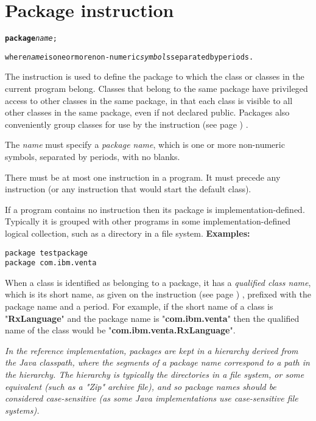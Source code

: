 \chapter{Package instruction}\label{refpackage}
\begin{shaded}
\begin{alltt}
\textbf{package} \emph{name};

where \emph{name} is one or more non-numeric \emph{symbol}s separated by periods.
\end{alltt}
\end{shaded}
 
The  instruction is used to define the package to which
the class or classes in the current program belong.
 Classes that belong to the same package have privileged access to
other classes in the same package, in that each class is visible to all
other classes in the same package, even if not declared public.
Packages also conveniently group classes for use by the
  instruction (see page \pageref{refimport}) .
 
The \emph{name} must specify a \emph{package name}, which is one
or more non-numeric symbols, separated by periods, with no
blanks.
 
There must be at most one  instruction in a program.
It must precede any  instruction (or any instruction that
would start the default class).
 
If a program contains no  instruction then its package
is implementation-defined.  Typically it is grouped with other programs
in some implementation-defined logical collection, such as a directory
in a file system.
 \textbf{Examples:}
\begin{lstlisting}
package testpackage
package com.ibm.venta
\end{lstlisting}
 
When a class is identified as belonging to a package, it has a
\emph{qualified class name}, which is its short name, as given on the
  instruction (see page \pageref{refclass}) , prefixed with the package
name and a period.
For example, if the short name of a class is
"\textbf{RxLanguage}" and the package name is
"\textbf{com.ibm.venta}" then the qualified name of the class
would be "\textbf{com.ibm.venta.RxLanguage}".
 
\emph{In the reference implementation, packages are kept in a hierarchy
derived from the Java classpath, where the segments of a package name
correspond to a path in the hierarchy.
The hierarchy is typically the directories in a file system, or some
equivalent (such as a "Zip" archive file), and so package names
should be considered case-sensitive (as some Java implementations use
case-sensitive file systems).
}
